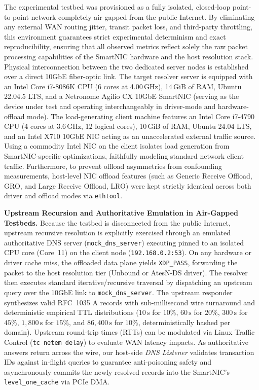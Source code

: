 \documentclass[a4paper,fleqn,colorlinks,hidelinks]{cas-sc}
\begin{document}
The experimental testbed was provisioned as a fully isolated, closed-loop point-to-point network completely air-gapped from the public Internet. By eliminating any external WAN routing jitter, transit packet loss, and third-party throttling, this environment guarantees strict experimental determinism and exact reproducibility, ensuring that all observed metrics reflect solely the raw packet processing capabilities of the SmartNIC hardware and the host resolution stack. Physical interconnection between the two dedicated server nodes is established over a direct 10GbE fiber-optic link. The target resolver server is equipped with an Intel Core i7-8086K CPU (6 cores at 4.00\,GHz), 14\,GiB of RAM, Ubuntu 22.04.5 LTS, and a Netronome Agilio CX 10GbE SmartNIC (serving as the device under test and operating interchangeably in driver-mode and hardware-offload mode). The load-generating client machine features an Intel Core i7-4790 CPU (4 cores at 3.6\,GHz, 12 logical cores), 10\,GiB of RAM, Ubuntu 24.04 LTS, and an Intel X710 10GbE NIC acting as an unaccelerated external traffic source. Using a commodity Intel NIC on the client isolates load generation from SmartNIC-specific optimizations, faithfully modeling standard network client traffic. Furthermore, to prevent offload asymmetries from confounding measurements, host-level NIC offload features (such as Generic Receive Offload, GRO, and Large Receive Offload, LRO) were kept strictly identical across both driver and offload modes via \texttt{ethtool}.

\textbf{Upstream Recursion and Authoritative Emulation in Air-Gapped Testbeds.} Because the testbed is disconnected from the public Internet, upstream recursive resolution is explicitly exercised through an emulated authoritative DNS server (\texttt{mock\_dns\_server}) executing pinned to an isolated CPU core (Core~11) on the client node (\texttt{192.168.0.2:53}). On any hardware or driver cache miss, the offloaded data plane yields \texttt{XDP\_PASS}, forwarding the packet to the host resolution tier (Unbound or AtesN-DS driver). The resolver then executes standard iterative/recursive traversal by dispatching an upstream query over the 10GbE link to \texttt{mock\_dns\_server}. The upstream responder synthesizes valid RFC~1035 A records with sub-millisecond wire turnaround and deterministic empirical TTL distributions ($10\,\text{s}$ for $10\%$, $60\,\text{s}$ for $20\%$, $300\,\text{s}$ for $45\%$, $1{,}800\,\text{s}$ for $15\%$, and $86{,}400\,\text{s}$ for $10\%$, deterministically hashed per domain). Upstream round-trip times (RTTs) can be modulated via Linux Traffic Control (\texttt{tc netem delay}) to evaluate WAN latency impacts. As authoritative answers return across the wire, our host-side \textit{DNS Listener} validates transaction IDs against in-flight queries to guarantee anti-poisoning safety and asynchronously commits the newly resolved records into the SmartNIC's \texttt{level\_one\_cache} via PCIe DMA.
\end{document}
